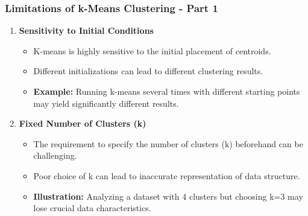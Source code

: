 \documentclass[aspectratio=169]{beamer}
\begin{document}
\begin{frame}[fragile]
    \frametitle{Limitations of k-Means Clustering - Part 1}
    \begin{enumerate}
        \item \textbf{Sensitivity to Initial Conditions}  
        \begin{itemize}
            \item K-means is highly sensitive to the initial placement of centroids.
            \item Different initializations can lead to different clustering results.
            \item \textbf{Example:} Running k-means several times with different starting points may yield significantly different results.
        \end{itemize}
        
        \item \textbf{Fixed Number of Clusters (k)}
        \begin{itemize}
            \item The requirement to specify the number of clusters (k) beforehand can be challenging.
            \item Poor choice of k can lead to inaccurate representation of data structure.
            \item \textbf{Illustration:} Analyzing a dataset with 4 clusters but choosing k=3 may lose crucial data characteristics.
        \end{itemize}
    \end{enumerate}
\end{frame}
\end{document}
